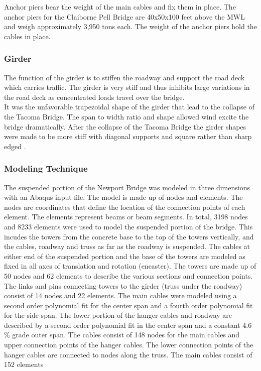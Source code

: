 Anchor piers bear the weight of the main cables and fix them in place. The anchor piers for the Claiborne Pell Bridge are 40x50x100 feet above the MWL and
weigh approximately 3,950 tons each. The weight of the anchor piers hold the cables in place. 

\subsubsection{Girder}

The function of the girder is to stiffen the roadway and support the road deck which carries traffic. The girder is very stiff and thus inhibits large
variations in the road deck as concentrated loads travel over the bridge.\\ 
\indent It was the unfavorable trapezoidal shape of the girder that lead to the collapse of the Tacoma Bridge. The span to width ratio and shape allowed
wind excite the bridge dramatically. After the collapse of the Tacoma Bridge the girder shapes were made to be more stiff with diagonal supports and
square rather than sharp edged \cite{manoj}. 

\subsubsection{Modeling Technique}

The suspended portion of the Newport Bridge was modeled in three dimensions with an Abaqus input file. 
The model is made up of nodes and elements. The nodes are coordinates that define the location of the connection points of each element. 
The elements represent beams or beam segments. In total, 3198 nodes and 8233 elements were used to model the suspended portion of the bridge. 
This incudes the towers from the concrete base to the top of the towers vertically, and the cables, roadway and truss as far as the roadway is suspended. 
The cables at either end of the suspended portion and the base of the towers are modeled as fixed in all axes of translation and rotation (encaster).
The towers are made up of 50 nodes and 62 elements to describe the various sections and connection points. 
The links and pins connecting towers to the girder (truss under the roadway) consist of 14 nodes and 22 elements. 
The main cables were modeled using a second order polynomial fit for the center span and a fourth order polynomial fit for the side span. 
The lower portion of the hanger cables and roadway are described by a second order polynomial fit in the center span and a constant 4.6 \% grade outer span. 
The cables consist of 148 nodes for the main cables and upper connection points of the hanger cables.
The lower connection points of the hanger cables are connected to nodes along the truss. The main cables consist of 152 elements 


